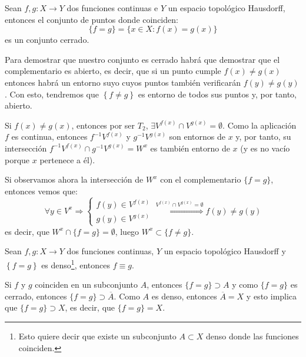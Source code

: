 \begin{prop}
Sean $f, g: X \rightarrow Y$ dos funciones continuas e $Y$ un espacio topológico Hausdorff, entonces el conjunto de puntos donde coinciden:
\[
\{f = g\} = \{x \in X : f\left( x \right) = g\left( x \right)\}
\]
es un conjunto cerrado.
\end{prop}
\begin{demo}
Para demostrar que nuestro conjunto es cerrado habrá que demostrar que el complementario es abierto, es decir, que si un punto cumple $f\left( x \right) \neq g\left( x \right)$ entonces habrá un entorno suyo cuyos puntos también verificarán $f\left( y \right) \neq g\left( y \right)$. Con esto, tendremos que $\left\{ f \neq g \right\}$ es entorno de todos sus puntos y, por tanto, abierto.

Si $f\left( x \right) \neq g\left( x \right)$, entonces por ser $T_2$, $\exists V^{f\left( x \right)} \cap V^{g\left( x \right)} = \emptyset$. Como la aplicación $f$ es continua, entonces $f^{-1}V^{f\left( x \right)}$ y $g^{-1}V^{g\left( x \right)}$ son entornos de $x$ y, por tanto, su intersección $f^{-1}V^{f\left( x \right)} \cap g^{-1}V^{g\left( x \right)} = W^x$ es también entorno de $x$ (y es no vacío porque $x$ pertenece a él).

Si observamos ahora la intersección de $W^x$ con el complementario $\{f=g\}$, entonces vemos que:
\[
\forall y \in V^x \Rightarrow
\begin{cases}
        f\left( y \right) \in V^{f\left( x \right)} \\
        g\left( y \right) \in V^{g\left( x \right)} 
\end{cases}
\stackrel{V^{f(x)}\cap V^{g(x)} = \emptyset}{\Rightarrow} f \left( y \right) \neq g\left( y \right)
\]
es decir, que $W^x\cap \{f=g\} = \emptyset$, luego $W^x\subset \{f\neq g\}$.
\end{demo}

\begin{coro}
Sean $f, g: X \rightarrow Y$ dos funciones continuas, $Y$ un espacio topológico Hausdorff y $\left\{ f = g \right\}$ es denso\footnote{Esto quiere decir que existe un subconjunto $A\subset X$ denso donde las funciones coinciden.}, entonces $f \equiv g$.
\end{coro}
\begin{demo}
Si $f$ y $g$ coinciden en un subconjunto $A$, entonces $\{f = g\} \supset A$ y como $\{f = g\}$ es cerrado, entonces $\{f = g\} \supset \overline{A}$. Como $A$ es denso, entonces $\overline{A} = X$ y esto implica que $\{f=g\}\supset X$, es decir, que $\{f=g\} = X$.
\end{demo}

